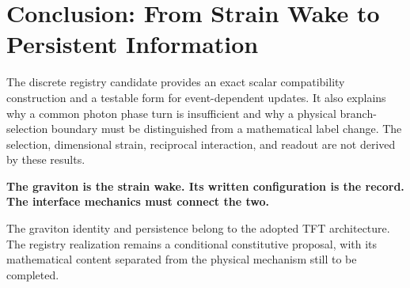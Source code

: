 \section{Conclusion: From Strain Wake to Persistent Information}
\label{sec:AW_conclusion}

The discrete registry candidate provides an exact scalar compatibility construction and a testable form for event-dependent updates. It also explains why a common photon phase turn is insufficient and why a physical branch-selection boundary must be distinguished from a mathematical label change. The selection, dimensional strain, reciprocal interaction, and readout are not derived by these results.

\noindent\textbf{The graviton is the strain wake. Its written configuration is the record. The interface mechanics must connect the two.}

The graviton identity and persistence belong to the adopted TFT architecture. The registry realization remains a conditional constitutive proposal, with its mathematical content separated from the physical mechanism still to be completed.
